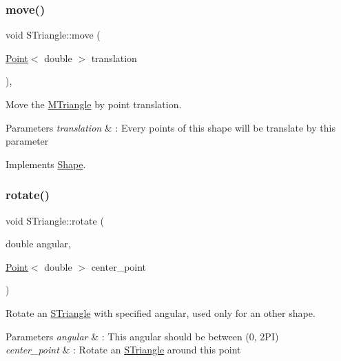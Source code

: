 \subsubsection{\texorpdfstring{move()}{move()}}
{\footnotesize\ttfamily void S\+Triangle\+::move (\begin{DoxyParamCaption}\item[{\hyperlink{classPoint}{Point}$<$ double $>$}]{translation }\end{DoxyParamCaption})\hspace{0.3cm}{\ttfamily [override]}, {\ttfamily [virtual]}}



Move the \hyperlink{classMTriangle}{M\+Triangle} by point translation. 


\begin{DoxyParams}{Parameters}
{\em translation} & \+: Every points of this shape will be translate by this parameter \\
\hline
\end{DoxyParams}


Implements \hyperlink{classShape_a52649731b2cb7b67315882d5e005f7e8}{Shape}.

\mbox{\label{classSTriangle_a56917c60e92ffa7eb74927c15b0c08a2}} 
\subsubsection{\texorpdfstring{rotate()}{rotate()}}
{\footnotesize\ttfamily void S\+Triangle\+::rotate (\begin{DoxyParamCaption}\item[{double}]{angular,  }\item[{\hyperlink{classPoint}{Point}$<$ double $>$}]{center\+\_\+point }\end{DoxyParamCaption})}



Rotate an \hyperlink{classSTriangle}{S\+Triangle} with specified angular, used only for an other shape. 


\begin{DoxyParams}{Parameters}
{\em angular} & \+: This angular should be between (0, 2\+PI) \\
\hline
{\em center\+\_\+point} & \+: Rotate an \hyperlink{classSTriangle}{S\+Triangle} around this point \\
\hline
\end{DoxyParams}
\mbox{\label{classSTriangle_a32e4cee65f52d9ee4121c78dc97d86ab}} 
